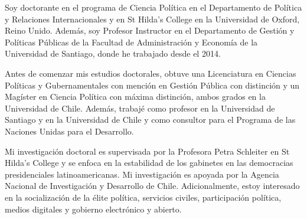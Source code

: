 




\vspace{3mm}

\begin{cvparagraph}

Soy doctorante en el programa de Ciencia Política en el Departamento de Política y Relaciones Internacionales y en St Hilda's College en la Universidad de Oxford, Reino Unido. Además, soy Profesor Instructor en el Departamento de Gestión y Políticas Públicas de la Facultad de Administración y Economía de la Universidad de Santiago, donde he trabajado desde el 2014.

Antes de comenzar mis estudios doctorales, obtuve una Licenciatura en Ciencias Políticas y Gubernamentales con mención en Gestión Pública con distinción y un Magíster en Ciencia Política con máxima distinción, ambos grados en la Universidad de Chile. Además, trabajé como profesor en la Universidad de Santiago y en la Universidad de Chile y como consultor para el Programa de las Naciones Unidas para el Desarrollo.

Mi investigación doctoral es supervisada por la Profesora Petra Schleiter en St Hilda's College y se enfoca en la estabilidad de los gabinetes en las democracias presidenciales latinoamericanas. Mi investigación es apoyada por la Agencia Nacional de Investigación y Desarrollo de Chile. Adicionalmente, estoy interesado en la socialización de la élite política, servicios civiles, participación política, medios digitales y gobierno electrónico y abierto.
\vspace{1mm}
\end{cvparagraph}
